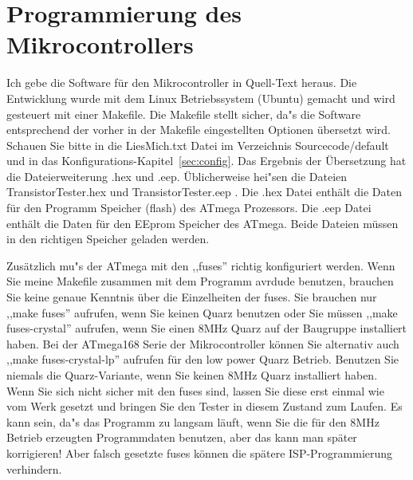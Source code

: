 \section{Programmierung des Mikrocontrollers}
Ich gebe die Software f\"ur den Mikrocontroller in Quell-Text heraus.
Die Entwicklung wurde mit dem Linux Betriebssystem (Ubuntu) gemacht
und wird gesteuert mit einer Makefile.
Die Makefile stellt sicher, da"s die Software entsprechend der vorher in der Makefile 
eingestellten Optionen \"ubersetzt wird. Schauen Sie bitte in die LiesMich.txt Datei
im Verzeichnis Sourcecode/default und in das Konfigurations-Kapitel~\ref{sec:config}.
Das Ergebnis der \"Ubersetzung hat die Dateierweiterung .hex und .eep.
\"Ublicherweise hei"sen die Dateien TransistorTester.hex und TransistorTester.eep .
Die .hex Datei enth\"alt die Daten f\"ur den Programm Speicher (flash) des ATmega Prozessors.
Die .eep Datei enth\"alt die Daten f\"ur den EEprom Speicher des ATmega.
Beide Dateien m\"ussen in den richtigen Speicher geladen werden.

Zus\"atzlich mu"s der ATmega mit den ,,fuses'' richtig konfiguriert werden.
Wenn Sie meine Makefile zusammen mit dem Programm avrdude benutzen, brauchen Sie
keine genaue Kenntnis \"uber die Einzelheiten der fuses.
Sie brauchen nur ,,make fuses'' aufrufen, wenn Sie keinen Quarz benutzen oder Sie
m\"ussen ,,make fuses-crystal'' aufrufen, wenn Sie einen 8MHz Quarz auf der Baugruppe installiert haben.
Bei der ATmega168 Serie der Mikrocontroller k\"onnen Sie alternativ auch
,,make fuses-crystal-lp'' aufrufen f\"ur den low power Quarz Betrieb.
Benutzen Sie niemals die Quarz-Variante, wenn Sie keinen 8MHz Quarz installiert haben.
Wenn Sie sich nicht sicher mit den fuses sind, lassen Sie diese erst einmal wie
vom Werk gesetzt und bringen Sie den Tester in diesem Zustand zum Laufen.
Es kann sein, da"s das Programm zu langsam l\"auft, wenn Sie die f\"ur den 8MHz Betrieb 
erzeugten Programmdaten benutzen, aber das kann man sp\"ater korrigieren!
Aber falsch gesetzte fuses k\"onnen die sp\"atere ISP-Programmierung verhindern.

